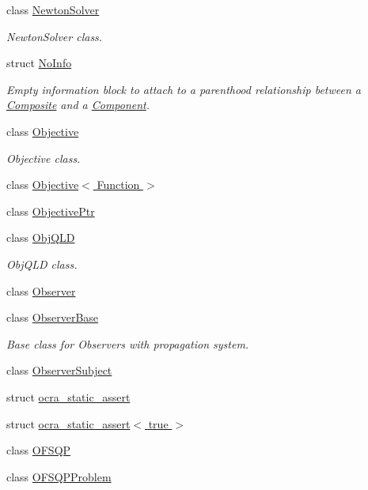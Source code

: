 \begin{DoxyCompactItemize}
\item 
class \hyperlink{classocra_1_1NewtonSolver}{Newton\+Solver}
\begin{DoxyCompactList}\small\item\em Newton\+Solver class. \end{DoxyCompactList}\item 
struct \hyperlink{structocra_1_1NoInfo}{No\+Info}
\begin{DoxyCompactList}\small\item\em Empty information block to attach to a parenthood relationship between a \hyperlink{classocra_1_1Composite}{Composite} and a \hyperlink{classocra_1_1Component}{Component}. \end{DoxyCompactList}\item 
class \hyperlink{classocra_1_1Objective}{Objective}
\begin{DoxyCompactList}\small\item\em Objective class. \end{DoxyCompactList}\item 
class \hyperlink{classocra_1_1Objective_3_01Function_01_4}{Objective$<$ Function $>$}
\item 
class \hyperlink{classocra_1_1ObjectivePtr}{Objective\+Ptr}
\item 
class \hyperlink{classocra_1_1ObjQLD}{Obj\+Q\+LD}
\begin{DoxyCompactList}\small\item\em Obj\+Q\+LD class. \end{DoxyCompactList}\item 
class \hyperlink{classocra_1_1Observer}{Observer}
\item 
class \hyperlink{classocra_1_1ObserverBase}{Observer\+Base}
\begin{DoxyCompactList}\small\item\em Base class for Observers with propagation system. \end{DoxyCompactList}\item 
class \hyperlink{classocra_1_1ObserverSubject}{Observer\+Subject}
\item 
struct \hyperlink{structocra_1_1ocra__static__assert}{ocra\+\_\+static\+\_\+assert}
\item 
struct \hyperlink{structocra_1_1ocra__static__assert_3_01true_01_4}{ocra\+\_\+static\+\_\+assert$<$ true $>$}
\item 
class \hyperlink{classocra_1_1OFSQP}{O\+F\+S\+QP}
\item 
class \hyperlink{classocra_1_1OFSQPProblem}{O\+F\+S\+Q\+P\+Problem}

\end{DoxyCompactItemize}
